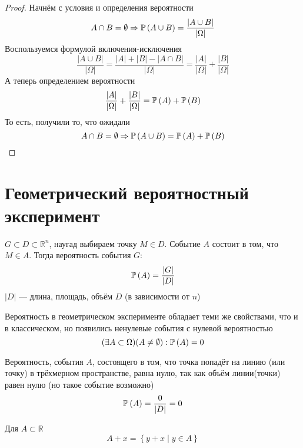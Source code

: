 \begin{proof}
    Начнём с условия и определения вероятности
    $$A\cap B=\emptyset
        \Rightarrow \mathbb{P}\left( A\cup B \right)
        =\frac{\left|A\cup B\right|}{\left|\Omega\right|}$$
    Воспользуемся формулой включения-исключения
    $$\frac{\left|A\cup B\right|}{\left|\Omega\right|}
        =\frac{\left|A\right|+\left|B\right|-\left|A\cap B\right|}
            {\left|\Omega\right|}
        =\frac{\left|A\right|}{\left|\Omega\right|}
            +\frac{\left|B\right|}{\left|\Omega\right|}$$
    А теперь определением вероятности
    $$\frac{\left|A\right|}{\left|\Omega\right|}
            +\frac{\left|B\right|}{\left|\Omega\right|}
        =\mathbb{P}\left( A \right)+\mathbb{P}\left( B \right)$$
    То есть, получили то, что ожидали
    $$A\cap B=\emptyset
        \Rightarrow \mathbb{P}\left( A\cup B \right)
            =\mathbb{P}\left( A \right)+\mathbb{P}\left( B \right)$$

\end{proof}

\section{Геометрический вероятностный эксперимент}
\begin{example}
    $G\subset D\subset \mathbb{R}^n$, наугад выбираем точку $M\in D$.
    Событие $A$ состоит в том, что $M\in A$. Тогда вероятность события $G$:
    $$\mathbb{P}\left( A \right)=\frac{\left|G\right|}{\left|D\right|}$$
    $\left|D\right|$ --- длина, площадь, объём $D$ (в зависимости от $n$)
\end{example}
Вероятность в геометрическом эксперименте обладает теми же свойствами,
что и в классическом, но появились ненулевые события с нулевой вероятностью
$$(\exists A\subset\Omega)(A\neq\emptyset): \mathbb{P}\left( A \right)=0$$
\begin{example}
    Вероятность, события $A$, состоящего в том,
    что точка попадёт на линию (или точку) в трёхмерном пространстве,
    равна нулю, так как объём линии(точки) равен нулю
    (но такое событие возможно)
    $$\mathbb{P}\left( A \right)=\frac{0}{\left|D\right|}=0$$
\end{example}

\begin{definition}
    Для $A\subset\mathbb{R}$
    $$A+x=\left\{y+x\mid y\in A\right\}$$
\end{definition}

